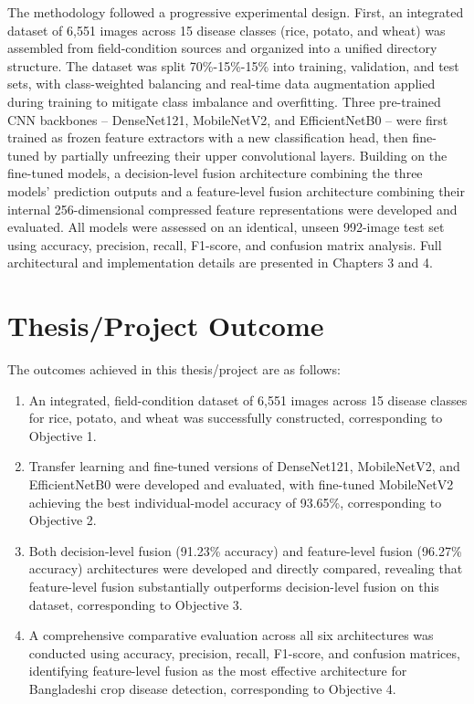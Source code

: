 The methodology followed a progressive experimental design. First, an integrated dataset of 6,551 images across 15 disease classes (rice, potato, and wheat) was assembled from field-condition sources and organized into a unified directory structure. The dataset was split 70\%-15\%-15\% into training, validation, and test sets, with class-weighted balancing and real-time data augmentation applied during training to mitigate class imbalance and overfitting. Three pre-trained CNN backbones -- DenseNet121, MobileNetV2, and EfficientNetB0 -- were first trained as frozen feature extractors with a new classification head, then fine-tuned by partially unfreezing their upper convolutional layers. Building on the fine-tuned models, a decision-level fusion architecture combining the three models' prediction outputs and a feature-level fusion architecture combining their internal 256-dimensional compressed feature representations were developed and evaluated. All models were assessed on an identical, unseen 992-image test set using accuracy, precision, recall, F1-score, and confusion matrix analysis. Full architectural and implementation details are presented in Chapters 3 and 4.
 


\section{Thesis/Project Outcome}

The outcomes achieved in this thesis/project are as follows:

\begin{enumerate} \it
    \item An integrated, field-condition dataset of 6,551 images across 15 disease classes for rice, potato, and wheat was successfully constructed, corresponding to Objective 1.
    \item Transfer learning and fine-tuned versions of DenseNet121, MobileNetV2, and EfficientNetB0 were developed and evaluated, with fine-tuned MobileNetV2 achieving the best individual-model accuracy of 93.65\%, corresponding to Objective 2.
    \item Both decision-level fusion (91.23\% accuracy) and feature-level fusion (96.27\% accuracy) architectures were developed and directly compared, revealing that feature-level fusion substantially outperforms decision-level fusion on this dataset, corresponding to Objective 3.
    \item A comprehensive comparative evaluation across all six architectures was conducted using accuracy, precision, recall, F1-score, and confusion matrices, identifying feature-level fusion as the most effective architecture for Bangladeshi crop disease detection, corresponding to Objective 4.
\end{enumerate}
 
